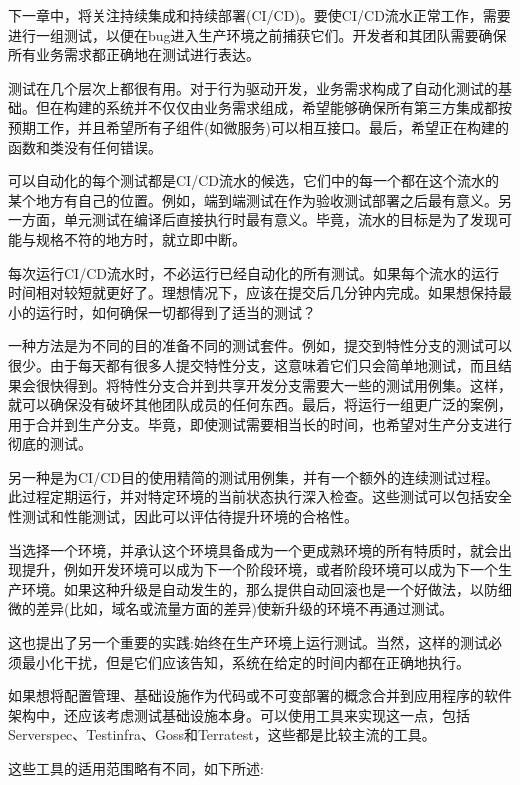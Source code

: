 
下一章中，将关注持续集成和持续部署(CI/CD)。要使CI/CD流水正常工作，需要进行一组测试，以便在bug进入生产环境之前捕获它们。开发者和其团队需要确保所有业务需求都正确地在测试进行表达。

测试在几个层次上都很有用。对于行为驱动开发，业务需求构成了自动化测试的基础。但在构建的系统并不仅仅由业务需求组成，希望能够确保所有第三方集成都按预期工作，并且希望所有子组件(如微服务)可以相互接口。最后，希望正在构建的函数和类没有任何错误。

可以自动化的每个测试都是CI/CD流水的候选，它们中的每一个都在这个流水的某个地方有自己的位置。例如，端到端测试在作为验收测试部署之后最有意义。另一方面，单元测试在编译后直接执行时最有意义。毕竟，流水的目标是为了发现可能与规格不符的地方时，就立即中断。

每次运行CI/CD流水时，不必运行已经自动化的所有测试。如果每个流水的运行时间相对较短就更好了。理想情况下，应该在提交后几分钟内完成。如果想保持最小的运行时，如何确保一切都得到了适当的测试？

一种方法是为不同的目的准备不同的测试套件。例如，提交到特性分支的测试可以很少。由于每天都有很多人提交特性分支，这意味着它们只会简单地测试，而且结果会很快得到。将特性分支合并到共享开发分支需要大一些的测试用例集。这样，就可以确保没有破坏其他团队成员的任何东西。最后，将运行一组更广泛的案例，用于合并到生产分支。毕竟，即使测试需要相当长的时间，也希望对生产分支进行彻底的测试。

另一种是为CI/CD目的使用精简的测试用例集，并有一个额外的连续测试过程。此过程定期运行，并对特定环境的当前状态执行深入检查。这些测试可以包括安全性测试和性能测试，因此可以评估待提升环境的合格性。

当选择一个环境，并承认这个环境具备成为一个更成熟环境的所有特质时，就会出现提升，例如开发环境可以成为下一个阶段环境，或者阶段环境可以成为下一个生产环境。如果这种升级是自动发生的，那么提供自动回滚也是一个好做法，以防细微的差异(比如，域名或流量方面的差异)使新升级的环境不再通过测试。

这也提出了另一个重要的实践:始终在生产环境上运行测试。当然，这样的测试必须最小化干扰，但是它们应该告知，系统在给定的时间内都在正确地执行。


如果想将配置管理、基础设施作为代码或不可变部署的概念合并到应用程序的软件架构中，还应该考虑测试基础设施本身。可以使用工具来实现这一点，包括Serverspec、Testinfra、Goss和Terratest，这些都是比较主流的工具。

这些工具的适用范围略有不同，如下所述:

